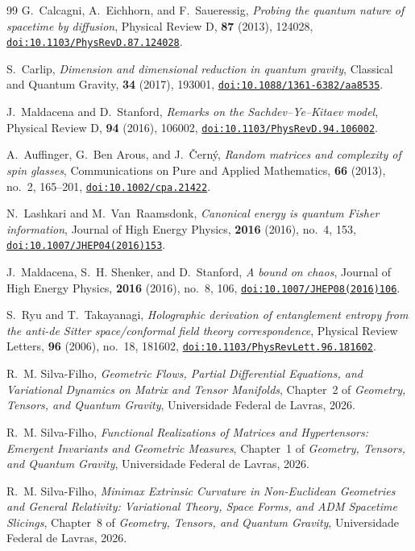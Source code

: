 \documentclass[11pt,a4paper,reqno]{amsart}
\theoremstyle{definition}
\numberwithin{equation}{section}
\providecommand{\doi}[1]{\href{https://doi.org/#1}{\nolinkurl{doi:#1}}}
\providecommand{\doi}[1]{\href{https://doi.org/#1}{\nolinkurl{doi:#1}}}
\begin{document}
\begin{thebibliography}{99}
G.~Calcagni, A.~Eichhorn, and F.~Saueressig,
\emph{Probing the quantum nature of spacetime by diffusion},
Physical Review D, \textbf{87} (2013), 124028,
\doi{10.1103/PhysRevD.87.124028}.

S.~Carlip,
\emph{Dimension and dimensional reduction in quantum gravity},
Classical and Quantum Gravity, \textbf{34} (2017), 193001,
\doi{10.1088/1361-6382/aa8535}.

J.~Maldacena and D.~Stanford,
\emph{Remarks on the Sachdev--Ye--Kitaev model},
Physical Review D, \textbf{94} (2016), 106002,
\doi{10.1103/PhysRevD.94.106002}.

A.~Auffinger, G.~Ben Arous, and J.~{\v{C}}ern{\'y},
\emph{Random matrices and complexity of spin glasses},
Communications on Pure and Applied Mathematics, \textbf{66} (2013), no.~2, 165--201,
\doi{10.1002/cpa.21422}.

N.~Lashkari and M.~Van~Raamsdonk,
\emph{Canonical energy is quantum Fisher information},
Journal of High Energy Physics, \textbf{2016} (2016), no.~4, 153,
\doi{10.1007/JHEP04(2016)153}.

J.~Maldacena, S.~H. Shenker, and D.~Stanford,
\emph{A bound on chaos},
Journal of High Energy Physics, \textbf{2016} (2016), no.~8, 106,
\doi{10.1007/JHEP08(2016)106}.

S.~Ryu and T.~Takayanagi,
\emph{Holographic derivation of entanglement entropy from the anti-de Sitter space/conformal field theory correspondence},
Physical Review Letters, \textbf{96} (2006), no.~18, 181602,
\doi{10.1103/PhysRevLett.96.181602}.

 R.~M. Silva-Filho, \emph{Geometric Flows, Partial Differential Equations, and Variational Dynamics on Matrix and Tensor Manifolds}, Chapter~2 of \emph{Geometry, Tensors, and Quantum Gravity}, Universidade Federal de Lavras, 2026.

 R.~M. Silva-Filho, \emph{Functional Realizations of Matrices and Hypertensors: Emergent Invariants and Geometric Measures}, Chapter~1 of \emph{Geometry, Tensors, and Quantum Gravity}, Universidade Federal de Lavras, 2026.

 R.~M. Silva-Filho, \emph{Minimax Extrinsic Curvature in Non-Euclidean Geometries and General Relativity: Variational Theory, Space Forms, and ADM Spacetime Slicings}, Chapter~8 of \emph{Geometry, Tensors, and Quantum Gravity}, Universidade Federal de Lavras, 2026.


\end{thebibliography}
\end{document}
